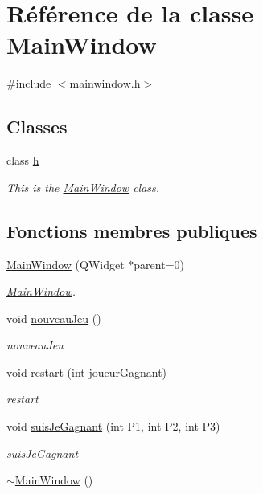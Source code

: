 \hypertarget{class_main_window}{\section{Référence de la classe Main\-Window}
\label{class_main_window}
}


{\ttfamily \#include $<$mainwindow.\-h$>$}

\subsection*{Classes}
\begin{DoxyCompactItemize}
\item 
class \hyperlink{class_main_window_1_1h}{h}
\begin{DoxyCompactList}\small\item\em This is the \hyperlink{class_main_window}{Main\-Window} class. \end{DoxyCompactList}\end{DoxyCompactItemize}
\subsection*{Fonctions membres publiques}
\begin{DoxyCompactItemize}
\item 
\hyperlink{class_main_window_a8b244be8b7b7db1b08de2a2acb9409db}{Main\-Window} (Q\-Widget $\ast$parent=0)
\begin{DoxyCompactList}\small\item\em \hyperlink{class_main_window}{Main\-Window}. \end{DoxyCompactList}\item 
void \hyperlink{class_main_window_a191288a043481fa695e4e546e2f76038}{nouveau\-Jeu} ()
\begin{DoxyCompactList}\small\item\em nouveau\-Jeu \end{DoxyCompactList}\item 
void \hyperlink{class_main_window_aded5036dd1d5ab1c06417b80ce705aef}{restart} (int joueur\-Gagnant)
\begin{DoxyCompactList}\small\item\em restart \end{DoxyCompactList}\item 
void \hyperlink{class_main_window_aee18876c586f3b6c1f668a040c9145cf}{suis\-Je\-Gagnant} (int P1, int P2, int P3)
\begin{DoxyCompactList}\small\item\em suis\-Je\-Gagnant \end{DoxyCompactList}\item 
\hyperlink{class_main_window_ae98d00a93bc118200eeef9f9bba1dba7}{$\sim$\-Main\-Window} ()
\end{DoxyCompactItemize}
